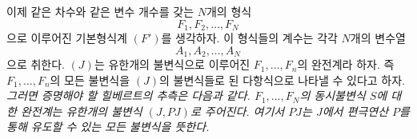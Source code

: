 
이제 같은 차수와 같은 변수 개수를 갖는 $N$개의 형식
\[
  F_1,F_2,\ldots,F_N
\]
으로 이루어진 기본형식계 $(F')$를 생각하자. 이 형식들의 계수는 각각 $N$개의 변수열
\[
  A_1,A_2,\ldots,A_N
\]
으로 취한다. $(J)$는 유한개의 불변식으로 이루어진 $F_1,\ldots,F_n$의 완전계라 하자. 즉 $F_1,\ldots,F_n$의 모든 불변식을 $(J)$의 불변식들로 된 다항식으로 나타낼 수 있다고 하자. \emph{그러면 증명해야 할 힐베르트의 추측은 다음과 같다. $F_1,\ldots,F_N$의 동시불변식 $S$에 대한 완전계는 유한개의 불변식 $(J,PJ)$로 주어진다. 여기서 $PJ$는 $J$에서 편극연산 $P$를 통해 유도할 수 있는 모든 불변식을 뜻한다.}
